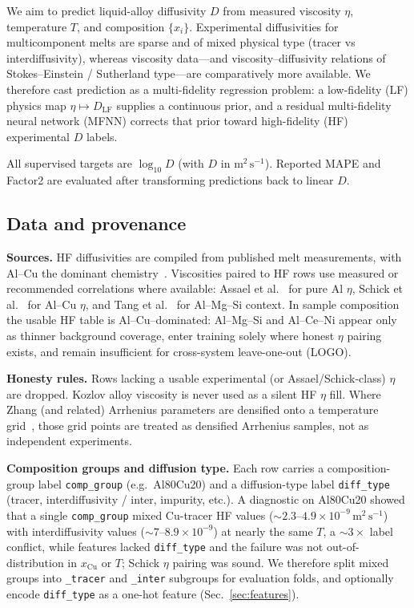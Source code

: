 \documentclass[review,12pt]{elsarticle}
\begin{document}
We aim to predict liquid-alloy diffusivity $D$ from measured viscosity $\eta$, temperature $T$, and composition $\{x_i\}$. Experimental diffusivities for multicomponent melts are sparse and of mixed physical type (tracer vs interdiffusivity), whereas viscosity data---and viscosity--diffusivity relations of Stokes--Einstein / Sutherland type---are comparatively more available. We therefore cast prediction as a multi-fidelity regression problem: a low-fidelity (LF) physics map $\eta \mapsto D_{\mathrm{LF}}$ supplies a continuous prior, and a residual multi-fidelity neural network (MFNN) corrects that prior toward high-fidelity (HF) experimental $D$ labels.

All supervised targets are $\log_{10} D$ (with $D$ in $\mathrm{m}^{2}\,\mathrm{s}^{-1}$). Reported MAPE and Factor2 are evaluated after transforming predictions back to linear $D$.

\subsection{Data and provenance}
\label{sec:data}

\textbf{Sources.} HF diffusivities are compiled from published melt measurements, with Al--Cu the dominant chemistry~\cite{chen2014,zhang2010prl,geng2014}. Viscosities paired to HF rows use measured or recommended correlations where available: Assael et al.~\cite{assael2006} for pure Al $\eta$, Schick et al.~\cite{schick2012} for Al--Cu $\eta$, and Tang et al.~\cite{tang2015} for Al--Mg--Si context. In sample composition the usable HF table is Al--Cu--dominated: Al--Mg--Si and Al--Ce--Ni appear only as thinner background coverage, enter training solely where honest $\eta$ pairing exists, and remain insufficient for cross-system leave-one-out (LOGO).

\textbf{Honesty rules.} Rows lacking a usable experimental (or Assael/Schick-class) $\eta$ are dropped. Kozlov alloy viscosity is never used as a silent HF $\eta$ fill. Where Zhang (and related) Arrhenius parameters are densified onto a temperature grid~\cite{zhang2010prl}, those grid points are treated as densified Arrhenius samples, not as independent experiments.

\textbf{Composition groups and diffusion type.} Each row carries a composition-group label \texttt{comp\_group} (e.g.\ Al80Cu20) and a diffusion-type label \texttt{diff\_type} (tracer, interdiffusivity / inter, impurity, etc.). A diagnostic on Al80Cu20 showed that a single \texttt{comp\_group} mixed Cu-tracer HF values ($\sim 2.3$--$4.9\times 10^{-9}\,\mathrm{m}^{2}\,\mathrm{s}^{-1}$) with interdiffusivity values ($\sim 7$--$8.9\times 10^{-9}$) at nearly the same $T$, a $\sim 3\times$ label conflict, while features lacked \texttt{diff\_type} and the failure was not out-of-distribution in $x_{\mathrm{Cu}}$ or $T$; Schick $\eta$ pairing was sound. We therefore split mixed groups into \texttt{\_tracer} and \texttt{\_inter} subgroups for evaluation folds, and optionally encode \texttt{diff\_type} as a one-hot feature (Sec.~\ref{sec:features}).
\end{document}
